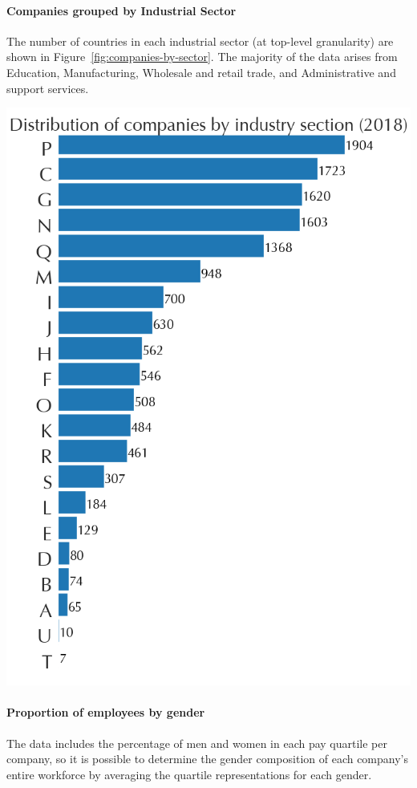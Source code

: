 \paragraph{Companies grouped by Industrial Sector}
    The number of countries in each industrial sector (at top-level granularity) are shown in Figure\ \ref{fig:companies-by-sector}. The majority of the data arises from Education, Manufacturing, Wholesale and retail trade, and Administrative and support services.

    \begin{centering}
        \includegraphics[width=0.6\linewidth]{images/2018-all-companies-sectors.png}
        \label{fig:companies-by-sector}
    \end{centering}
\vspace{-1.5em}
\paragraph*{Proportion of employees by gender}
The data includes the percentage of men and women in each pay quartile per company, so it is possible to determine the gender composition of each company's entire workforce by averaging the quartile representations for each gender. 


